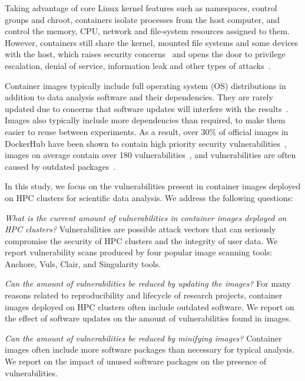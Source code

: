 \documentclass[a4paper,num-refs]{oup-contemporary}
\begin{document}
Taking advantage of core Linux kernel features such as namespaces, control
groups and chroot, containers isolate processes from the host computer, and
control the memory, CPU, network and file-system resources assigned to
them. However, containers still share the kernel, mounted file systems and
some devices with the host, which raises security
concerns~\cite{martin2018docker, sultan2019container, combe2016docker} and
opens the door to privilege escalation, denial of service, information leak
and other types of attacks~\cite{gantikow2016providing}. 

Container images typically include full operating system (OS) distributions in
addition to data analysis software and their dependencies. They are rarely
updated due to concerns that software updates will interfere with
the results~\cite{gronenschild2012effects, glatard2015reproducibility}.
Images also typically include more dependencies than required, to make them
easier to reuse between experiments. As a result, over 30\% of official
images in DockerHub have been shown to contain high priority security
vulnerabilities~\cite{gummaraju2015over}, images on average contain over
180 vulnerabilities~\cite{Shu2017}, and vulnerabilities are often caused by
outdated packages~\cite{zerouali2019relation}.

In this study, we focus on the vulnerabilities present in container images
deployed on HPC clusters for scientific data analysis. We address the
following questions:

\textit{What is the current amount of vulnerabilities in
container images deployed on HPC clusters?} Vulnerabilities are possible
attack vectors that can seriously compromise the security of HPC clusters
and the integrity of user data. We report vulnerability scans produced
by four popular image scanning tools: Anchore, Vuls, Clair, and Singularity tools.

\textit{Can the amount of vulnerabilities be reduced by updating the images?}  
For many reasons related to reproducibility and lifecycle of research
projects, container images deployed on HPC clusters often include outdated
software. We report on the effect of software updates on the amount of
vulnerabilities found in images.

\textit{Can the amount of vulnerabilities be reduced by minifying images?} 
Container images often include more software packages than necessary for 
typical analysis. We report on the impact of unused software packages on
the presence of vulnerabilities.
\end{document}

